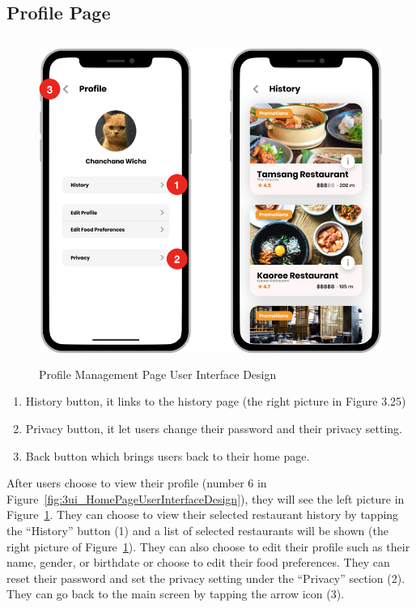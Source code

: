 \documentclass[12pt,oneside,openright,a4paper]{cpe-english-project}
\begin{document}
\subsection{Profile Page}
\begin{figure}[H]\centering
\includegraphics[height=300pt]{./images/3ui_ProfileManagementPageUserInterfaceDesign.png}
\caption{Profile Management Page User Interface Design}\label{fig:3ui_ProfileManagementPageUserInterfaceDesign}
\end{figure}
\begin{enumerate}
\item History button, it links to the history page (the right picture in Figure 3.25)
\item Privacy button, it let users change their password and their privacy setting.
\item Back button which brings users back to their home page.
\end{enumerate}
After users choose to view their profile (number 6 in Figure~\ref{fig:3ui_HomePageUserInterfaceDesign}), they will see the left picture in Figure~\ref{fig:3ui_ProfileManagementPageUserInterfaceDesign}. They can choose to view their selected restaurant history by tapping the “History” button (1) and a list of selected restaurants will be shown (the right picture of Figure~\ref{fig:3ui_ProfileManagementPageUserInterfaceDesign}). They can also choose to edit their profile such as their name, gender, or birthdate or choose to edit their food preferences. They can reset their password and set the privacy setting under the “Privacy” section (2). They can go back to the main screen by tapping the arrow icon (3).
\end{document}
